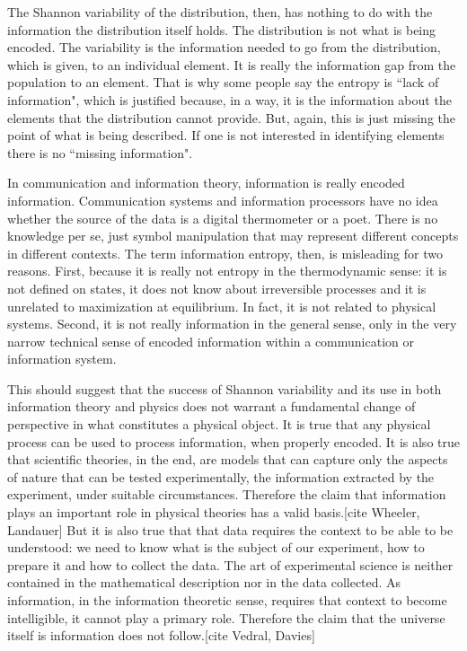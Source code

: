 \documentclass{article}
\begin{document}
The Shannon variability of the distribution, then, has nothing to do with the information the distribution itself holds. The distribution is not what is being encoded. The variability is the information needed to go from the distribution, which is given, to an individual element. It is really the information gap from the population to an element. That is why some people say the entropy is ``lack of information", which is justified because, in a way, it is the information about the elements that the distribution cannot provide. But, again, this is just missing the point of what is being described. If one is not interested in identifying elements there is no ``missing information".

In communication and information theory, information is really encoded information. Communication systems and information processors have no idea whether the source of the data is a digital thermometer or a poet. There is no knowledge per se, just symbol manipulation that may represent different concepts in different contexts. The term information entropy, then, is misleading for two reasons. First, because it is really not entropy in the thermodynamic sense: it is not defined on states, it does not know about irreversible processes and it is unrelated to maximization at equilibrium. In fact, it is not related to physical systems. Second, it is not really information in the general sense, only in the very narrow technical sense of encoded information within a communication or information system.

This should suggest that the success of Shannon variability and its use in both information theory and physics does not warrant a fundamental change of perspective in what constitutes a physical object. It is true that any physical process can be used to process information, when properly encoded. It is also true that scientific theories, in the end, are models that can capture only the aspects of nature that can be tested experimentally, the information extracted by the experiment, under suitable circumstances. Therefore the claim that information plays an important role in physical theories has a valid basis.[cite Wheeler, Landauer] But it is also true that that data requires the context to be able to be understood: we need to know what is the subject of our experiment, how to prepare it and how to collect the data. The art of experimental science is neither contained in the mathematical description nor in the data collected. As information, in the information theoretic sense, requires that context to become intelligible, it cannot play a primary role. Therefore the claim that the universe itself is information does not follow.[cite Vedral, Davies]
\end{document}
